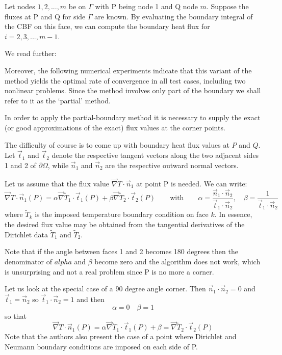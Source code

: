 Let nodes $1,2, ..., m$ be on $\Gamma$ with P being node 1 and Q node $m$.
Suppose the fluxes at P and Q for side $\Gamma$ are known. 
By evaluating the boundary integral of the CBF on this face, we can compute the 
boundary heat flux for $i=2,3, ...,m-1$.

We read further:
\begin{displayquote}
{\color{MidnightBlue}
Moreover, the following numerical
experiments indicate that this variant of the method yields the optimal rate of convergence in
all test cases, including two nonlinear problems. Since the method involves only part of the
boundary we shall refer to it as the `partial' method.

In order to apply the partial-boundary method it is necessary to supply the exact (or good
approximations of the exact) flux values at the corner points.}
\end{displayquote}

The difficulty of course is to come up with boundary heat flux values at $P$ and $Q$.
Let $\vec{t}_1$ and $\vec{t}_2$ denote the respective tangent vectors along the two adjacent 
sides 1 and 2 of $\partial\Omega$, while $\vec{n}_1$ and $\vec{n}_2$
are the respective outward normal vectors.

Let us assume that the flux value $\vec\nabla T \cdot \vec{n}_1$ at point P is needed.
We can write:
\[
\vec\nabla T \cdot \vec{n}_1(P) = 
\alpha \vec\nabla \tilde{T}_1 \cdot \vec{t}_1(P)
+
\beta \vec\nabla \tilde{T}_2 \cdot \vec{t}_2(P)
\qquad
\text{with}
\qquad
\alpha = \frac{\vec{n}_1 \cdot \vec{n}_2 }{\vec{t}_1 \cdot \vec{n}_2},
\quad
\beta = \frac{1 }{\vec{t}_1 \cdot \vec{n}_2}
\] 
where $\tilde{T}_k$ is the imposed temperature boundary condition on face $k$.
In essence, the desired flux value may be obtained from the tangential derivatives of the Dirichlet
data $\tilde{T}_1$ and $\tilde{T}_2$. 

Note that if the angle between faces 1 and 2 becomes 180 degrees then 
the denominator of $alpha$ and $\beta$ become zero and the 
algorithm does not work, which is unsurprising and not a real problem since P is no more a corner.

Let us look at the special case of a 90 degree angle corner. Then $\vec{n}_1 \cdot \vec{n}_2 =0$
and $\vec{t}_1 = \vec{n}_2$ so $\vec{t}_1 \cdot \vec{n}_2=1$ and then  
\[
\alpha = 0 
\quad
\beta = 1 
\]
so that
\[
\vec\nabla T \cdot \vec{n}_1(P) = 
\alpha \vec\nabla \tilde{T}_1 \cdot \vec{t}_1(P)
+
\beta 
=\vec\nabla \tilde{T}_2 \cdot \vec{t}_2(P)
\]
Note that the authors also present the case of a point where Dirichlet and Neumann
boundary conditions are imposed on each side of P.

